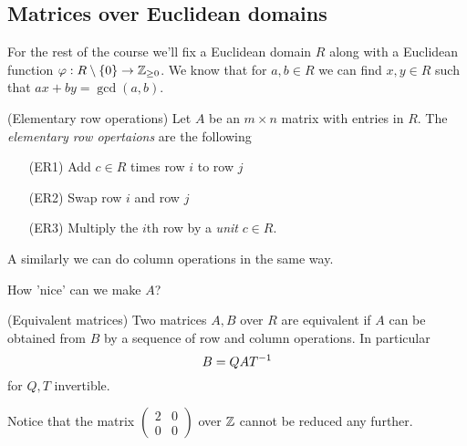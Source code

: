 \documentclass{article}
\begin{document}
\subsection{Matrices over Euclidean domains}
For the rest of the course we'll fix a Euclidean domain $ R $ along with a Euclidean function $ \varphi: R\setminus \{0\}\to \mathbb{Z}_{\ge 0} $. We know that for $ a,b\in R $ we can find $ x,y\in R $ such that $ ax+by=\gcd(a,b) $.
\begin{definition}
	(Elementary row operations) Let $ A $ be an $ m\times n $ matrix with entries in $ R $. The \textit{elementary row opertaions} are the following
	\begin{enumerate}
		\item [(ER1)] Add $ c\in R $ times row $ i $ to row $ j $
		\item [(ER2)] Swap row $ i $ and row $ j $
		\item [(ER3)] Multiply the $ i $th row by a \textit{unit} $ c\in R $. 
	\end{enumerate}
	A similarly we can do column operations in the same way.
\end{definition}
How 'nice' can we make $ A $?
\begin{definition}
	(Equivalent matrices) Two matrices $ A,B $ over $ R $ are equivalent if $ A $ can be obtained from $ B $ by a sequence of row and column operations. In particular
	\[
	  B=QA{T}^{-1}
	\]
	for $ Q,T $ invertible.
\end{definition}
Notice that the matrix $
\begin{pmatrix}
	2 & 0 \\
	0 & 0 
\end{pmatrix} $
over $ \mathbb{Z} $ cannot be reduced any further.
\end{document}

